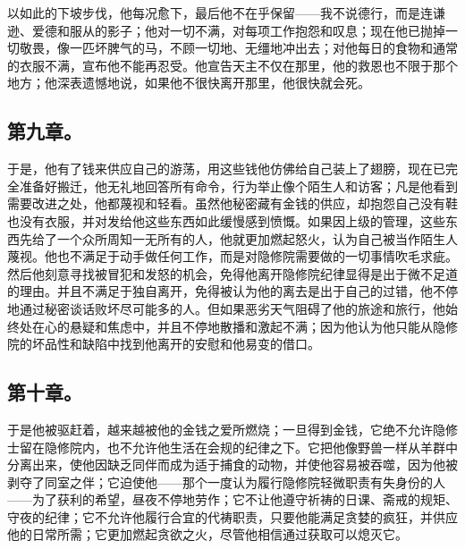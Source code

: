 \par

以如此的下坡步伐，他每况愈下，最后他不在乎保留——我不说德行，而是连谦逊、爱德和服从的影子；他对一切不满，对每项工作抱怨和叹息；现在他已抛掉一切敬畏，像一匹坏脾气的马，不顾一切地、无缰地冲出去；对他每日的食物和通常的衣服不满，宣布他不能再忍受。他宣告天主不仅在那里，他的救恩也不限于那个地方；他深表遗憾地说，如果他不很快离开那里，他很快就会死。\par


\subsection{第九章。}

\par

于是，他有了钱来供应自己的游荡，用这些钱他仿佛给自己装上了翅膀，现在已完全准备好搬迁，他无礼地回答所有命令，行为举止像个陌生人和访客；凡是他看到需要改进之处，他都蔑视和轻看。虽然他秘密藏有金钱的供应，却抱怨自己没有鞋也没有衣服，并对发给他这些东西如此缓慢感到愤慨。如果因上级的管理，这些东西先给了一个众所周知一无所有的人，他就更加燃起怒火，认为自己被当作陌生人蔑视。他也不满足于动手做任何工作，而是对隐修院需要做的一切事情吹毛求疵。然后他刻意寻找被冒犯和发怒的机会，免得他离开隐修院纪律显得是出于微不足道的理由。并且不满足于独自离开，免得被认为他的离去是出于自己的过错，他不停地通过秘密谈话败坏尽可能多的人。但如果恶劣天气阻碍了他的旅途和旅行，他始终处在心的悬疑和焦虑中，并且不停地散播和激起不满；因为他认为他只能从隐修院的坏品性和缺陷中找到他离开的安慰和他易变的借口。\par


\subsection{第十章。}

\par

于是他被驱赶着，越来越被他的金钱之爱所燃烧；一旦得到金钱，它绝不允许隐修士留在隐修院内，也不允许他生活在会规的纪律之下。它把他像野兽一样从羊群中分离出来，使他因缺乏同伴而成为适于捕食的动物，并使他容易被吞噬，因为他被剥夺了同室之伴；它迫使他——那个一度认为履行隐修院轻微职责有失身份的人——为了获利的希望，昼夜不停地劳作；它不让他遵守祈祷的日课、斋戒的规矩、守夜的纪律；它不允许他履行合宜的代祷职责，只要他能满足贪婪的疯狂，并供应他的日常所需；它更加燃起贪欲之火，尽管他相信通过获取可以熄灭它。\par

